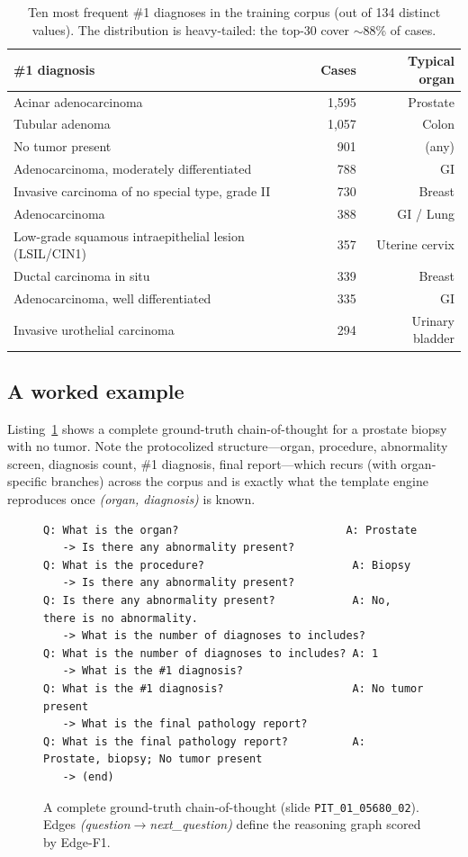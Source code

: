 \documentclass[11pt,a4paper]{article}
\newcommand{\code}[1]{\texttt{\small #1}}
\begin{document}
\begin{table}[h]
\centering
\caption{Ten most frequent \#1 diagnoses in the training corpus (out of 134 distinct values).
The distribution is heavy-tailed: the top-30 cover $\sim$88\% of cases.}
\label{tab:topdx}
\begin{tabular}{lrr}
\toprule
\#1 diagnosis & Cases & Typical organ \\
\midrule
Acinar adenocarcinoma & 1{,}595 & Prostate \\
Tubular adenoma & 1{,}057 & Colon \\
No tumor present & 901 & (any) \\
Adenocarcinoma, moderately differentiated & 788 & GI \\
Invasive carcinoma of no special type, grade II & 730 & Breast \\
Adenocarcinoma & 388 & GI / Lung \\
Low-grade squamous intraepithelial lesion (LSIL/CIN1) & 357 & Uterine cervix \\
Ductal carcinoma in situ & 339 & Breast \\
Adenocarcinoma, well differentiated & 335 & GI \\
Invasive urothelial carcinoma & 294 & Urinary bladder \\
\bottomrule
\end{tabular}
\end{table}

\subsection{A worked example}
Listing~\ref{lst:cot} shows a complete ground-truth chain-of-thought for a prostate biopsy with
no tumor. Note the protocolized structure---organ, procedure, abnormality screen, diagnosis
count, \#1 diagnosis, final report---which recurs (with organ-specific branches) across the
corpus and is exactly what the template engine reproduces once \emph{(organ, diagnosis)} is
known.

\begin{figure}[h]
\begin{footnotesize}
\begin{verbatim}
Q: What is the organ?                          A: Prostate
   -> Is there any abnormality present?
Q: What is the procedure?                       A: Biopsy
   -> Is there any abnormality present?
Q: Is there any abnormality present?            A: No, there is no abnormality.
   -> What is the number of diagnoses to includes?
Q: What is the number of diagnoses to includes? A: 1
   -> What is the #1 diagnosis?
Q: What is the #1 diagnosis?                    A: No tumor present
   -> What is the final pathology report?
Q: What is the final pathology report?          A: Prostate, biopsy; No tumor present
   -> (end)
\end{verbatim}
\end{footnotesize}
\caption{A complete ground-truth chain-of-thought (slide \code{PIT\_01\_05680\_02}). Edges
\emph{(question$\rightarrow$next\_question)} define the reasoning graph scored by Edge-F1.}
\label{lst:cot}
\end{figure}
\end{document}
